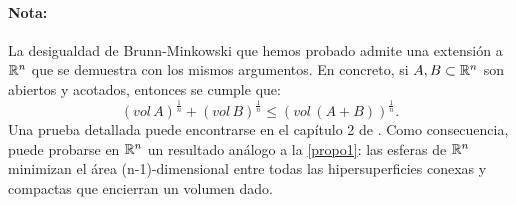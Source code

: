 \paragraph{Nota:} La desigualdad de Brunn-Minkowski que hemos probado admite una extensión a $\mathbb{R}^n$ que se demuestra con los mismos argumentos. En concreto, si $A,B \subset \mathbb{R}^n$ son abiertos y acotados, entonces se cumple que:
\begin{equation*}
    (vol \, A)^{\frac{1}{n}} + (vol \, B)^{\frac{1}{n}} \leq (vol \, (A+B))^{\frac{1}{n}}.
\end{equation*}
%
Una prueba detallada puede encontrarse en el capítulo 2 de \cite{geometricinequalities}.
Como consecuencia, puede probarse en $\mathbb{R}^n$ un resultado análogo a la \ref{propo1}: las esferas de $\mathbb{R}^n$ minimizan el área (n-1)-dimensional entre todas las hipersuperficies conexas y compactas que encierran un volumen dado.
